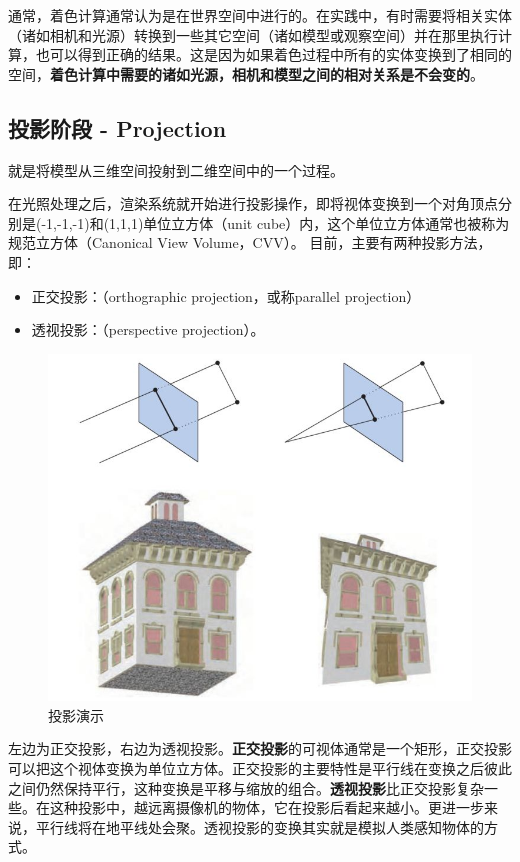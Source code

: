 \documentclass[UTF8,a4paper,12pt]{ctexbook}
\begin{document}
			通常，着色计算通常认为是在世界空间中进行的。在实践中，有时需要将相关实体（诸如相机和光源）转换到一些其它空间（诸如模型或观察空间）并在那里执行计算，也可以得到正确的结果。这是因为如果着色过程中所有的实体变换到了相同的空间，\textbf{着色计算中需要的诸如光源，相机和模型之间的相对关系是不会变的}。
			
		\subsection{投影阶段 - Projection} 
			就是将模型从三维空间投射到二维空间中的一个过程。
			
			在光照处理之后，渲染系统就开始进行投影操作，即将视体变换到一个对角顶点分别是(-1,-1,-1)和(1,1,1)单位立方体（unit cube）内，这个单位立方体通常也被称为规范立方体（Canonical View Volume，CVV）。
			目前，主要有两种投影方法，即：
			\begin{itemize}
				\item 正交投影：（orthographic projection，或称parallel projection）
				\item 透视投影：（perspective projection）。
			\end{itemize}
			
			\begin{figure}[H]
				\centering
				\includegraphics[scale=0.57]{project}
				\caption{投影演示}
			\end{figure}
			
			左边为正交投影，右边为透视投影。\textbf{正交投影}的可视体通常是一个矩形，正交投影可以把这个视体变换为单位立方体。正交投影的主要特性是平行线在变换之后彼此之间仍然保持平行，这种变换是平移与缩放的组合。\textbf{透视投影}比正交投影复杂一些。在这种投影中，越远离摄像机的物体，它在投影后看起来越小。更进一步来说，平行线将在地平线处会聚。透视投影的变换其实就是模拟人类感知物体的方式。
			
\end{document}
